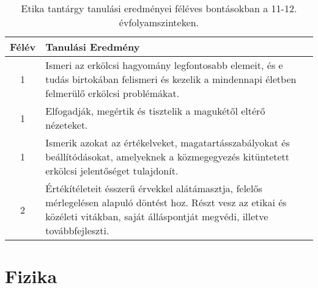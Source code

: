       
           \begin{longtable}{c | p{} }
            \caption[Etika 11-12.]{Etika tantárgy tanulási eredményei féléves bontásokban a 11-12. évfolyamszinteken. }  \\

            \textbf{Félév} & \textbf{Tanulási Eredmény} \\
            \hline
            \endhead
                                
                                          1 &  Ismeri az erkölcsi hagyomány legfontosabb elemeit, és e tudás birtokában felismeri és kezelik a mindennapi életben felmerülő erkölcsi problémákat. \\ \hline
                                          1 &  Elfogadják, megértik és tisztelik a magukétől eltérő nézeteket. \\ \hline
                                          1 &  Ismerik azokat az értékelveket, magatartásszabályokat és beállítódásokat, amelyeknek a közmegegyezés kitüntetett erkölcsi jelentőséget tulajdonít. \\ \hline
                                      
                                
                                          2 &  Értékítéleteit ésszerű érvekkel alátámasztja, felelős mérlegelésen alapuló döntést hoz. Részt vesz az etikai és közéleti vitákban, saját álláspontját megvédi, illetve továbbfejleszti. \\ \hline
                                      
                        \end{longtable}
            \clearpage

        \section{Fizika}

